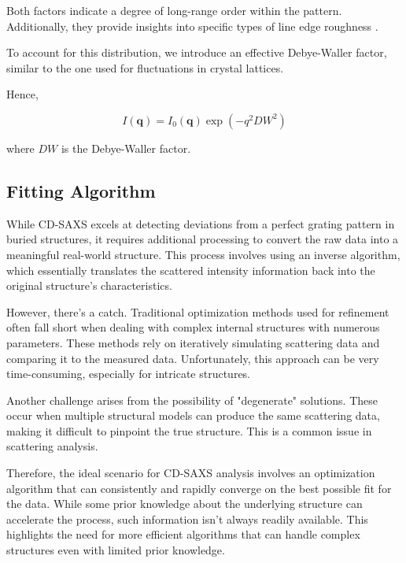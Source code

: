 Both factors indicate a degree of long-range order within the pattern. Additionally, they provide insights into specific types of line edge roughness \cite{these_reche}.

To account for this distribution, we introduce an effective Debye-Waller factor, similar to the one used for fluctuations in crystal lattices.

Hence,

\begin{equation}
    I(\mathbf{q}) = I_{0}(\mathbf{q}) \exp(-q^{2}DW^{2} )
\end{equation}

where $DW$ is the Debye-Waller factor.

\subsection{Fitting Algorithm}

While CD-SAXS excels at detecting deviations from a perfect grating pattern in buried structures, it requires 
additional processing to convert the raw data into a meaningful real-world structure. This process involves using 
an inverse algorithm, which essentially translates the scattered intensity information back into the original structure's 
characteristics.

\medskip

However, there's a catch. Traditional optimization methods used for refinement often fall short when dealing with 
complex internal structures with numerous parameters. These methods rely on iteratively simulating scattering data 
and comparing it to the measured data. Unfortunately, this approach can be very time-consuming, especially for intricate structures.

\medskip

Another challenge arises from the possibility of "degenerate" solutions. These occur when multiple structural 
models can produce the same scattering data, making it difficult to pinpoint the true structure. This is a common 
issue in scattering analysis.

\medskip

Therefore, the ideal scenario for CD-SAXS analysis involves an optimization algorithm that can consistently and 
rapidly converge on the best possible fit for the data. While some prior knowledge about the underlying structure 
can accelerate the process, such information isn't always readily available. This highlights the need for more 
efficient algorithms that can handle complex structures even with limited prior knowledge.

